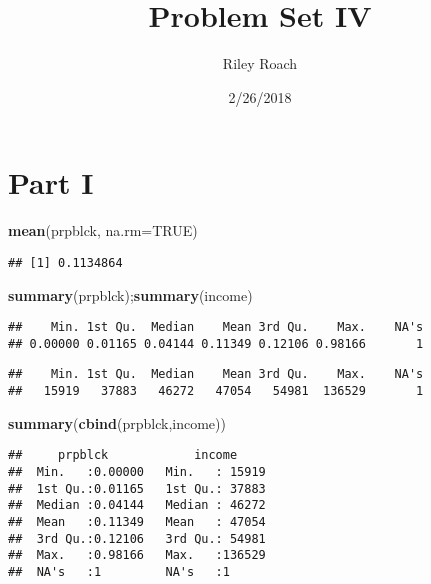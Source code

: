 \documentclass[]{article}
\title{Problem Set IV}
\author{Riley Roach}
\date{2/26/2018}
\newenvironment{Shaded}{\begin{snugshade}}{\end{snugshade}}
\newcommand{\KeywordTok}[1]{\textcolor[rgb]{0.13,0.29,0.53}{\textbf{#1}}}
\newcommand{\DataTypeTok}[1]{\textcolor[rgb]{0.13,0.29,0.53}{#1}}
\newcommand{\OtherTok}[1]{\textcolor[rgb]{0.56,0.35,0.01}{#1}}
\newcommand{\NormalTok}[1]{#1}
\begin{document}
\maketitle

\section{Part I}\label{part-i}

\begin{Shaded}
\begin{Highlighting}[]
\KeywordTok{mean}\NormalTok{(prpblck,}
     \DataTypeTok{na.rm=}\OtherTok{TRUE}\NormalTok{)}
\end{Highlighting}
\end{Shaded}

\begin{verbatim}
## [1] 0.1134864
\end{verbatim}

\begin{Shaded}
\begin{Highlighting}[]
\KeywordTok{summary}\NormalTok{(prpblck);}\KeywordTok{summary}\NormalTok{(income)}
\end{Highlighting}
\end{Shaded}

\begin{verbatim}
##    Min. 1st Qu.  Median    Mean 3rd Qu.    Max.    NA's 
## 0.00000 0.01165 0.04144 0.11349 0.12106 0.98166       1
\end{verbatim}

\begin{verbatim}
##    Min. 1st Qu.  Median    Mean 3rd Qu.    Max.    NA's 
##   15919   37883   46272   47054   54981  136529       1
\end{verbatim}

\begin{Shaded}
\begin{Highlighting}[]
\KeywordTok{summary}\NormalTok{(}\KeywordTok{cbind}\NormalTok{(prpblck,income))}
\end{Highlighting}
\end{Shaded}

\begin{verbatim}
##     prpblck            income      
##  Min.   :0.00000   Min.   : 15919  
##  1st Qu.:0.01165   1st Qu.: 37883  
##  Median :0.04144   Median : 46272  
##  Mean   :0.11349   Mean   : 47054  
##  3rd Qu.:0.12106   3rd Qu.: 54981  
##  Max.   :0.98166   Max.   :136529  
##  NA's   :1         NA's   :1
\end{verbatim}
\end{document}

